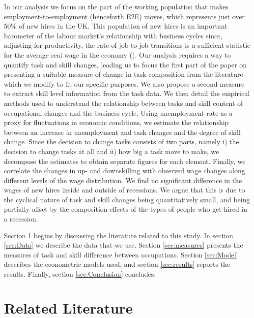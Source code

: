 \documentclass[11pt, oneside]{article}
\begin{document}
	\vspace{2mm}
	
	In our analysis we focus on the part of the working population that makes employment-to-employment (henceforth E2E) moves, which represents just over 50\% of new hires in the UK. This population of new hires is an important barometer of the labour market's relationship with  business cycles since, adjusting for productivity, the rate of job-to-job transitions is a sufficient statistic for the average real wage in the economy (\cite{MoscariniPostelVinay}). Our analysis requires a way to quantify task and skill changes, leading us to focus the first part of the paper on presenting a suitable measure of change in task composition from the literature which we modify to fit our specific purposes. We also propose a second measure to extract skill level information from the task data. We then detail the empirical methods used to understand the relationship between tasks and skill content of occupational changes and the business cycle. Using unemployment rate as a proxy for fluctuations in economic conditions, we estimate the relationship between an increase in unemployment and task changes and the degree of skill change. Since the decision to change tasks consists of two parts, namely i) the decision to change tasks at all and ii) how big a task move to make, we decompose the estimates to obtain separate figures for each element. Finally, we correlate the changes in up- and downskilling with observed wage changes along different levels of the wage distribution. We find no significant difference in the wages of new hires inside and outside of recessions. We argue that this is due to the cyclical nature of task and skill changes being quantitatively small, and being partially offset by the composition effects of the types of people who get hired in a recession. 
	
	
	\vspace{2mm}
	
	
	Section \ref{sec:Lit} begins by discussing the literature related to this study. In section \ref{sec:Data} we describe the data that we use. Section \ref{sec:measures} presents the measures of task and skill difference between occupations. Section \ref{sec:Model} describes the econometric models used, and section \ref{sec:results} reports the results. Finally, section \ref{sec:Conclusion} concludes.
	
	
	\section{Related Literature}
	\label{sec:Lit}
	\vspace{2mm}
	
\end{document}
